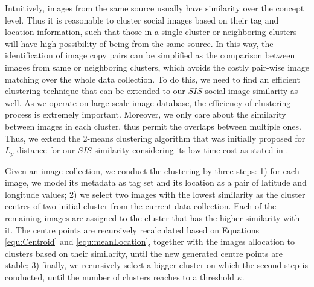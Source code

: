 \documentclass[runningheads,a4paper]{llncs}
\begin{document}
Intuitively, images from the same source usually have similarity over the concept level. 
Thus it is reasonable to cluster social images based on their tag and location information, 
such that those in a single cluster or neighboring clusters will have high possibility of being from the same source. 
In this way, the identification of image copy pairs can be simplified as the comparison between images from same or neighboring clusters, 
which avoids the costly pair-wise image matching over the whole data collection. 
To do this, we need to find an efficient clustering technique that can be extended to our $SIS$ social image similarity as well. 
As we operate on large scale image database, the efficiency of clustering process is extremely important. 
Moreover, we only care about the similarity between images in each cluster, thus permit the overlaps between multiple ones. Thus, we extend the 2-means clustering algorithm that was initially proposed for $L_p$ distance for our $SIS$ similarity considering its low time cost as stated in \cite{DBLP:conf/sigmod/ShenZH05,DBLP:journals/tkde/ZhouZCSBT10}. 

Given an image collection, we conduct the clustering by three steps: 
1) for each image, we model its metadata as tag set and its location as a pair of latitude and longitude values;
2) we select two images with the lowest similarity as the cluster centres of two initial cluster from the current data collection. Each of the remaining images are assigned to the cluster that has the higher similarity with it. The centre points are recursively recalculated based on Equations \ref{equ:Centroid} and \ref{equ:meanLocation}, together with the images allocation to clusters based on their similarity, until the new generated centre points are stable;
3) finally, we recursively select a bigger cluster on which the second step is conducted, until the number of clusters reaches to a threshold $\kappa$.
\end{document}
